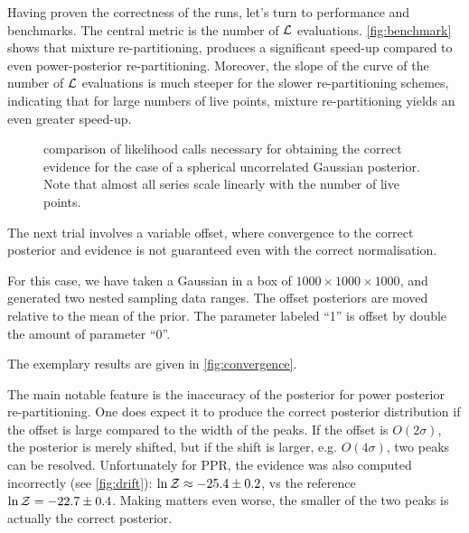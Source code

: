 \documentclass[usenatbib]{mnras}
\begin{document}
Having proven the correctness of the runs, let's turn to performance
and benchmarks. The central metric is the number of \({\cal L}\)
evaluations. \autoref{fig:benchmark} shows that mixture
re-partitioning, produces a significant speed-up compared to even
power-posterior re-partitioning. Moreover, the slope of the curve of
the number of \({\cal L}\) evaluations is much steeper for the
slower re-partitioning schemes, indicating that for large numbers of
live points, mixture re-partitioning yields an even greater
speed-up.



\begin{figure}
  
\caption{comparison of likelihood calls necessary for obtaining the correct evidence for the case of a spherical uncorrelated Gaussian posterior. Note that almost all series scale linearly with the number of live points. \label{fig:benchmark}}
\end{figure}




The next trial involves a variable offset, where convergence to the
correct posterior and evidence is not guaranteed even with the
correct normalisation.

For this case, we have taken a Gaussian in a box of
\(1000\times1000\times1000\), and generated two nested sampling data
ranges. The offset posteriors are moved relative to the mean of the
prior. The parameter labeled ``1'' is offset by double the amount of
parameter ``0''.

The exemplary results are given in \autoref{fig:convergence}.

The main notable feature is the inaccuracy of the posterior for
power posterior re-partitioning. One does expect it to produce the
correct posterior distribution if the offset is large compared to
the width of the peaks. If the offset is \(O(2\sigma)\), the
posterior is merely shifted, but if the shift is larger,
e.g. \(O(4\sigma)\), two peaks can be resolved. Unfortunately for
PPR, the evidence was also computed incorrectly (see
\autoref{fig:drift}): \(\ln {\cal Z}\approx -25.4 \pm 0.2\), vs the
reference \(\ln {\cal Z} = -22.7 \pm 0.4\).  Making matters even
worse, the smaller of the two peaks is actually the correct
posterior.
\end{document}
